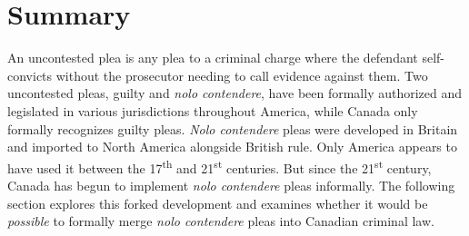 \section{Summary}

An uncontested plea is any plea to a criminal charge where the defendant self-convicts without the prosecutor needing to call evidence against them. Two uncontested pleas, guilty and \textit{nolo contendere}, have been formally authorized and legislated in various jurisdictions throughout America, while Canada only formally recognizes guilty pleas. \textit{Nolo contendere} pleas were developed in Britain and imported to North America alongside British rule. Only America appears to have used it between the 17\textsuperscript{th} and 21\textsuperscript{st} centuries. But since the 21\textsuperscript{st} century, Canada has begun to implement \textit{nolo contendere} pleas informally. The following section explores this forked development and examines whether it would be \textit{possible} to formally merge \textit{nolo contendere} pleas into Canadian criminal law. 
